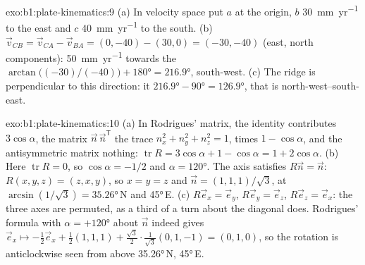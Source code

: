 \begin{solution}{exo:b1:plate-kinematics:9}
(a) In velocity space put $a$ at the origin, $b$ \qty{30}{mm.yr^{-1}} to the
east and $c$ \qty{40}{mm.yr^{-1}} to the south. (b) $\vec v_{CB} =
\vec v_{CA} - \vec v_{BA} = (0, -40) - (30, 0) = (-30, -40)$ (east, north
components): \qty{50}{mm.yr^{-1}} towards the 
$\arctan\bigl((-30)/(-40)\bigr) + \ang{180} = \ang{216.9}$, south-west. (c) The
ridge is perpendicular to this direction: it 
$\ang{216.9} - \ang{90} = \ang{126.9}$, that is north-west--south-east.
\end{solution}

\begin{solution}{exo:b1:plate-kinematics:10}
(a) In Rodrigues' matrix, the identity contributes $3\cos\alpha$, the matrix
$\vec n\,\vec n^{\mathsf T}$ the trace $n_x^2 + n_y^2 + n_z^2 = 1$, times
$1 - \cos\alpha$, and the antisymmetric matrix nothing: $\operatorname{tr}R =
3\cos\alpha + 1 - \cos\alpha = 1 + 2\cos\alpha$. (b) Here $\operatorname{tr}R = 0$,
so $\cos\alpha = -1/2$ and $\alpha = \ang{120}$. The axis satisfies $R\vec n =
\vec n$: $R(x, y, z) = (z, x, y)$, so $x = y = z$ and $\vec n =
(1, 1, 1)/\sqrt3$, at  $\arcsin(1/\sqrt3) = \ang{35.26}$\,N and
 \ang{45}\,E. (c) $R\vec e_x = \vec e_y$, $R\vec e_y = \vec e_z$,
$R\vec e_z = \vec e_x$: the three axes are permuted, as a third of a turn about
the diagonal does. Rodrigues' formula with $\alpha = +\ang{120}$ about $\vec n$
indeed gives $\vec e_x\mapsto -\tfrac12\vec e_x + \tfrac12(1, 1, 1) +
\tfrac{\sqrt3}{2}\cdot\tfrac{1}{\sqrt3}(0, 1, -1) = (0, 1, 0)$, so the rotation
is anticlockwise seen from above \ang{35.26}\,N, \ang{45}\,E.
\end{solution}

